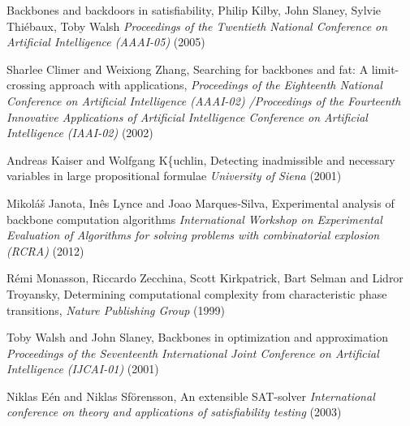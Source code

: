   Backbones and backdoors in satisfiability,
  Philip Kilby, John Slaney, Sylvie Thi{\'e}baux, Toby Walsh
  \textit{Proceedings of the Twentieth National Conference on Artificial Intelligence (AAAI-05)}
  (2005)

  Sharlee Climer and Weixiong Zhang,
  Searching for backbones and fat: A limit-crossing approach with applications,
  \textit{Proceedings of the Eighteenth National Conference on Artificial Intelligence (AAAI-02) /Proceedings of the Fourteenth Innovative Applications of Artificial Intelligence Conference on Artificial Intelligence (IAAI-02)}
  (2002)

  Andreas Kaiser and Wolfgang K{\{u}chlin,
  Detecting inadmissible and necessary variables in large propositional formulae
  \textit{University of Siena}
  (2001)

  Mikol{\'a}{\v{s}} Janota, In{\^e}s Lynce and Joao Marques-Silva,
  Experimental analysis of backbone computation algorithms
  \textit{International Workshop on Experimental Evaluation of Algorithms for solving problems with combinatorial explosion (RCRA)}
  (2012)

  R{\'e}mi Monasson, Riccardo Zecchina, Scott Kirkpatrick, Bart Selman and Lidror Troyansky,
  Determining computational complexity from characteristic phase transitions,
  \textit{Nature Publishing Group}
  (1999)

  Toby Walsh and John Slaney,
    Backbones in optimization and approximation
  \textit{Proceedings of the Seventeenth International Joint Conference on Artificial Intelligence (IJCAI-01)}
    (2001)
	
  Niklas E{\'e}n and Niklas Sf{\"o}rensson,
  An extensible {SAT}-solver
  \textit{International conference on theory and applications of satisfiability testing}
  (2003)

